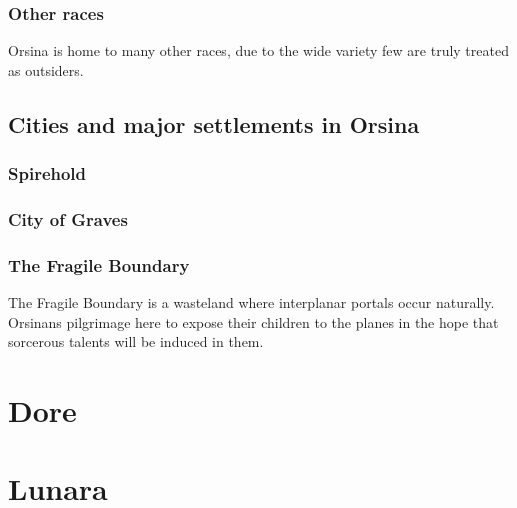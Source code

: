 \documentclass[10pt,twoside,twocolumn,openany,justified,bg=full,nomultitoc]{dndbook}
\begin{document}
\subsection{Other races}
\label{sec-3-3-7}
Orsina is home to many other races, due to the wide variety few are truly treated as outsiders.

\section{Cities and major settlements in Orsina}
\label{sec-3-4}
\subsection{Spirehold}
\label{sec-3-4-1}
\subsection{City of Graves}
\label{sec-3-4-2}
\subsection{The Fragile Boundary}
\label{sec-3-4-3}
The Fragile Boundary is a wasteland where interplanar portals occur naturally. Orsinans pilgrimage here to expose their children to the planes in the hope that sorcerous talents will be induced in them.  

\chapter{Dore}
\label{sec-4}

\chapter{Lunara}
\label{sec-5}
\end{document}
